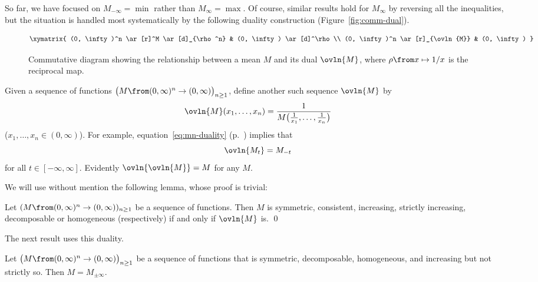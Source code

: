 So far, we have focused on $M_{-\infty} = \min$ rather than $M_\infty
= \max$.  Of course, similar results hold for $M_\infty$ by reversing all
the inequalities, but the situation is handled most systematically by the following duality%
% 
%
% 
construction (Figure~\ref{fig:comm-dual}).
% 
\begin{figure}
\[
\normalsize
\xymatrix{
(0, \infty)^n \ar[r]^M \ar[d]_{\rho^n}  &
(0, \infty) \ar[d]^\rho \\
(0, \infty)^n \ar[r]_{\ovln{M}} &
(0, \infty)
}
\]
\caption{Commutative diagram showing the relationship between a mean $M$
  and its dual $\ovln{M}$, where $\rho \from x \mapsto 1/x$ is the
  reciprocal map.}
\end{figure}
% 
Given a sequence of functions
$\bigl(M\from (0, \infty)^n \to (0, \infty)\bigr)_{n \geq 1}$, define
another such sequence $\ovln{M}$ by
\[
\ovln{M}(x_1, \ldots, x_n) 
=
\frac{1}{M\bigl(\frac{1}{x_1}, \ldots, \frac{1}{x_n}\bigr)}
\]
($x_1, \ldots, x_n \in (0, \infty)$).  For example,
equation~\eqref{eq:mn-duality} (p.~\pageref{eq:mn-duality}) implies that
\[
\ovln{M_t} = M_{-t}
\]
for all $t \in [-\infty, \infty]$.  Evidently $\ovln{\ovln{M}} = M$ for any
$M$.  

We will use without mention the following lemma, whose proof is trivial:
% 
\begin{lemma}
Let $(M\from (0, \infty)^n \to (0, \infty))_{n \geq 1}$ be a sequence of
functions.  Then $M$ is symmetric, consistent, increasing, strictly
increasing, decomposable or homogeneous (respectively) if and only if
$\ovln{M}$ is.
\qed
\end{lemma}

The next result uses this duality.

\begin{propn}
Let $\bigl(M \from (0, \infty)^n \to (0, \infty)\bigr)_{n \geq 1}$ be a
sequence of functions that is symmetric, decomposable, homogeneous, and
increasing but not strictly so.  Then $M = M_{\pm \infty}$.
\end{propn}

